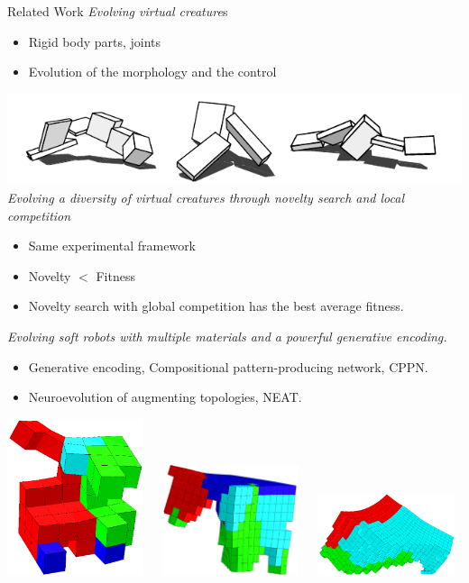 \documentclass{beamer}
\begin{document}
\begin{frame}[allowframebreaks]{Related Work}
\textit{Evolving virtual creature}s~\cite{sims1994evolving}
\begin{itemize}
\item Rigid body parts, joints
\item Evolution of the morphology and the control
\end{itemize}
\includegraphics[scale=0.5]{../Figures/Misc/evolvingVirtualCreatures.png}\\
\textit{Evolving a diversity of virtual creatures through novelty search and local competition} ~\cite{lehman2011evolving}
\begin{itemize}
\item Same experimental framework
\item Novelty $<$ Fitness
\item Novelty search with global competition has the best average fitness.
\end{itemize}
\newpage
\textit{Evolving soft robots with multiple materials and a powerful generative encoding.}~\cite{cheney2013unshackling}
\begin{itemize}
\item Generative encoding, Compositional pattern-producing network, CPPN.
\item Neuroevolution of augmenting topologies, NEAT.
\end{itemize}
\vspace{0.3cm}
\includegraphics[width=0.3\textwidth,height=0.25\textheight]{../Figures/Misc/unshacklingEvolutionFigure1.png}\	\	\	
\includegraphics[width=0.3\textwidth,height=0.25\textheight]{../Figures/Misc/unshacklingEvolutionFigure2.png}\	\	\	
\includegraphics[width=0.3\textwidth,height=0.25\textheight]{../Figures/Misc/unshacklingEvolutionFigure3.png}
\end{frame}
\end{document}
